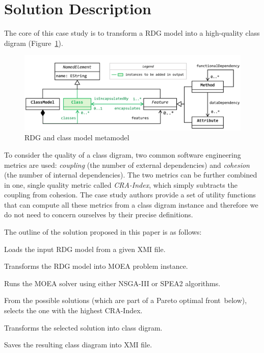 
\section{Solution Description}
\label{sec:SolutionDescription}

The core of this case study is to transform a RDG model into a high-quality class digram (\Cf Figure~\ref{fig:Metamodel}).

\begin{figure}[h!tb]
  \centering
  \includegraphics[width=.8\textwidth]{figures/metamodel.pdf}
  \caption{RDG and class model metamodel}
  \label{fig:Metamodel}
\end{figure}

To consider the quality of a class digram, two common software engineering metrics are used: \emph{coupling} (the number of external dependencies) and \emph{cohesion} (the number of internal dependencies).
The two metrics can be further combined in one, single quality metric called \emph{CRA-Index}, which simply subtracts the coupling from cohesion.
The case study authors provide a set of utility functions that can compute all these metrics from a class digram instance and therefore we do not need to concern ourselves by their precise definitions.

The outline of the solution proposed in this paper is as follows:

\begin{compactenum}
  \item Loads the input RDG model from a given XMI file.
  \item Transforms the RDG model into MOEA problem instance.
  \item Runs the MOEA solver using either NSGA-III or SPEA2 algorithms.
  \item From the possible solutions (which are part of a Pareto optimal front~\Cf below), selects the one with the highest CRA-Index.
  \item Transforms the selected solution into class digram.
  \item Saves the resulting class diagram into XMI file.
\end{compactenum}

